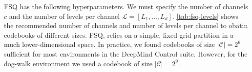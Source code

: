 \documentclass{article}
\makeatletter
\theoremstyle{plain}
\theoremstyle{definition}
\theoremstyle{remark}
\newcommand{\ie}{\textit{i.e.\@}\xspace}
\newcommand{\R}{\mathbb{R}}
\makeatother
\begin{document}
FSQ has the following hyperparameters. We must specify the number of channels $c$ and the number of levels per channel
$\mathcal{L} = [L_{1},\ldots,L_{d}]$.
\cref{tab:fsq-levels} shows the recommended number of channels and number of levels per channel to obatin codebooks of
different sizes.
FSQ, relies on a simple, fixed grid partition in a much
lower-dimensional space.
In practice, we found codebooks of size $|\mathcal{C}|=2^{6}$ sufficient for most environments in the DeepMind Control suite.
However, for the dog-walk environment we used a codebook of size $|\mathcal{C}|=2^{9}$.








\end{document}
